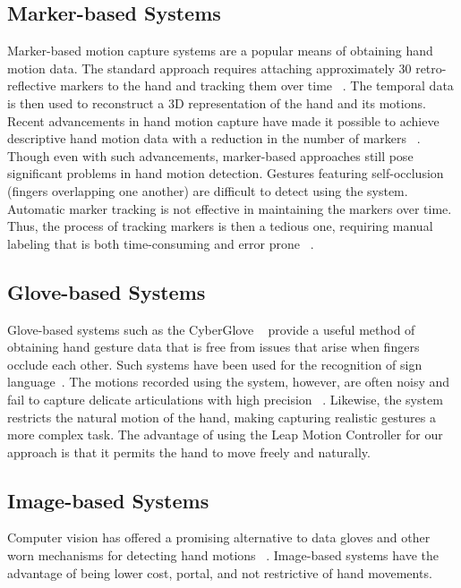 \documentclass[review]{acmsiggraph}
\begin{document}
\subsection{Marker-based Systems}

Marker-based motion capture systems are a popular
means of obtaining hand motion data. The standard approach
requires attaching approximately 30 retro-reflective
markers to the hand and tracking them over time ~\cite{VIC}.
The temporal data is then used to reconstruct a 3D representation
of the hand and its motions.
Recent advancements in hand motion capture have made
it possible to achieve descriptive hand motion data with a
reduction in the number of markers ~\cite{HRM12}. Though
even with such advancements, marker-based approaches
still pose significant problems in hand motion detection.
Gestures featuring self-occlusion (fingers overlapping one
another) are difficult to detect using the system. Automatic
marker tracking is not effective in maintaining the markers
over time. Thus, the process of tracking markers is then a
tedious one, requiring manual labeling that is both time-consuming
and error prone ~\cite{ZCX12}.


\subsection{Glove-based Systems}

Glove-based systems such as the CyberGlove ~\cite{CYB}
provide a useful method of obtaining hand gesture data that
is free from issues that arise when fingers occlude each
other. Such systems have been used for the recognition of 
sign language~\cite{Vogler03Handshapes}. 
The motions recorded using the system, however, are
often noisy and fail to capture delicate articulations with
high precision ~\cite{ZCX12}. Likewise, the system restricts the
natural motion of the hand, making capturing realistic gestures
a more complex task. The advantage of using the
Leap Motion Controller for our approach is that it permits
the hand to move freely and naturally. 

\subsection{Image-based Systems}

Computer vision has offered a promising alternative to
data gloves and other worn mechanisms for detecting hand
motions ~\cite{EBN07}. Image-based systems have the advantage 
of being lower cost, portal, and not restrictive of hand movements.
\end{document}
